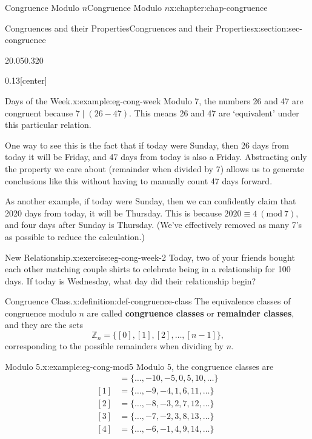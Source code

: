 \documentclass[oneside,10pt,]{book}
\newcommand{\terminology}[1]{\textbf{#1}}
\numberwithin{equation}{section}
\newcommand{\Mod}[1]{\ \left(\mathrm{mod}\ #1\right)}
\newcommand{\amp}{&}
\begin{document}
\begin{chapterptx}{Congruence Modulo \(n\)}{}{Congruence Modulo \(n\)}{}{}{x:chapter:chap-congruence}
\begin{sectionptx}{Congruences and their Properties}{}{Congruences and their Properties}{}{}{x:section:sec-congruence}
\begin{sidebyside}{2}{0.05}{0.32}{0}
\begin{sbspanel}{0.13}[center]
\end{sbspanel}%
\end{sidebyside}%
\begin{example}{Days of the Week.}{x:example:eg-cong-week}%
Modulo 7, the numbers 26 and 47 are congruent because \(7 \mid (26-47)\). This means 26 and 47 are `equivalent' under this particular relation.%
\par
One way to see this is the fact that if today were Sunday, then 26 days from today it will be Friday, and 47 days from today is also a Friday. Abstracting only the property we care about (remainder when divided by 7) allows us to generate conclusions like this without having to manually count 47 days forward.%
\par
As another example, if today were Sunday, then we can confidently claim that 2020 days from today, it will be Thursday. This is because \(2020 \equiv 4 \Mod{7}\), and four days after Sunday is Thursday. (We've effectively removed as many 7's as possible to reduce the calculation.)%
\end{example}
\begin{inlineexercise}{New Relationship.}{x:exercise:eg-cong-week-2}%
Today, two of your friends bought each other matching couple shirts to celebrate being in a relationship for 100 days. If today is Wednesday, what day did their relationship begin?%
\end{inlineexercise}
\begin{definition}{Congruence Class.}{x:definition:def-congruence-class}%
The equivalence classes of congruence modulo \(n\) are called \terminology{congruence classes} or \terminology{remainder classes}, and they are the sets%
\begin{equation*}
\mathbb{Z}_n = \{[0],[1],[2],\ldots,[n-1]\}\text{,}
\end{equation*}
corresponding to the possible remainders when dividing by \(n\). \label{g:notation:id228652}%
\end{definition}
\begin{example}{Modulo 5.}{x:example:eg-cong-mod5}%
Modulo 5, the congruence classes are%
\begin{align*}
[0] \amp = \{\ldots,-10,-5,0,5,10,\ldots\}\\
[1] \amp = \{\ldots,-9,-4,1,6,11,\ldots\}\\
[2] \amp = \{\ldots,-8,-3,2,7,12,\ldots\}\\
[3] \amp = \{\ldots,-7,-2,3,8,13,\ldots\}\\
[4] \amp = \{\ldots,-6,-1,4,9,14,\ldots\}

\end{align*}
\end{example}
\end{sectionptx}
\end{chapterptx}
\end{document}
